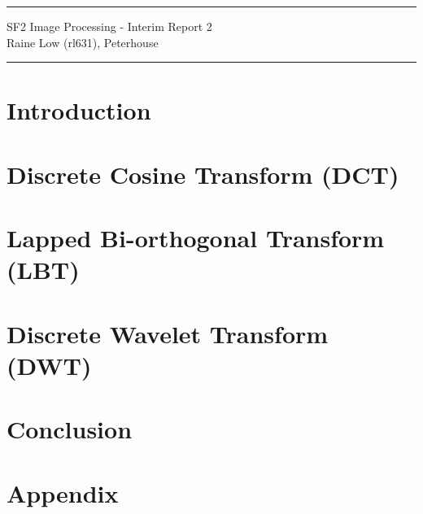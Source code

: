 \documentclass[paper = a4, 11pt]{article}
\begin{document}
\noindent
\rule{18cm}{0.3mm}
\begin{center}
    {SF2 Image Processing - Interim Report 2\\
    Raine Low (rl631), Peterhouse}
\end{center}
\vspace{-2mm}
\rule{18cm}{0.3mm}

\section*{Introduction}
\label{sec:introduction}
\vspace{-2mm}


\section{Discrete Cosine Transform (DCT)}
\label{sec:dct}
\vspace{-2mm}


\section{Lapped Bi-orthogonal Transform (LBT)}
\label{sec:lbt}
\vspace{-2mm}


\section{Discrete Wavelet Transform (DWT)}
\label{sec:dwt}
\vspace{-2mm}


\section*{Conclusion}
\label{sec:conclusion}
\vspace{-5mm}


\newpage
\appendix
\section{Appendix}
\label{sec:appendix}

\end{document}
